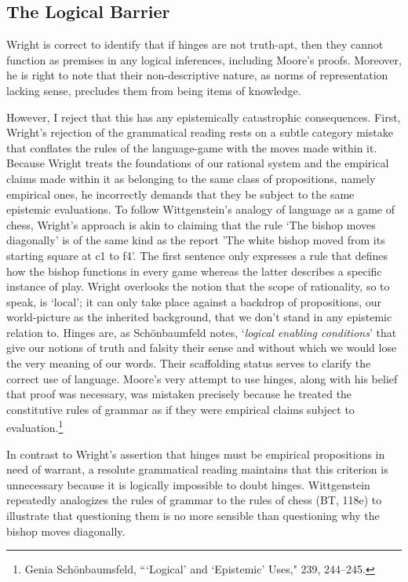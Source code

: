 \subsection{The Logical Barrier}

Wright is correct to identify that if hinges are not truth-apt, then
they cannot function as premises in any logical inferences, including
Moore's proofs. Moreover, he is right to note that their non-descriptive
nature, as norms of representation lacking sense, precludes them from
being items of knowledge.

However, I reject that this has any epistemically catastrophic
consequences. First, Wright's rejection of the grammatical reading rests
on a subtle category mistake that conflates the rules of the
language-game with the moves made within it. Because Wright treats the
foundations of our rational system and the empirical claims made within
it as belonging to the same class of propositions, namely empirical
ones, he incorrectly demands that they be subject to the same epistemic
evaluations. To follow Wittgenstein's analogy of language as a game of
chess, Wright's approach is akin to claiming that the rule `The bishop
moves diagonally' is of the same kind as the report 'The white bishop
moved from its starting square at c1 to f4'. The first sentence only
expresses a rule that defines how the bishop functions in every game
whereas the latter describes a specific instance of play. Wright
overlooks the notion that the scope of rationality, so to speak, is
`local'; it can only take place against a backdrop of propositions, our
world-picture as the inherited background, that we don't stand in any
epistemic relation to. Hinges are, as Schönbaumfeld notes,
`\emph{logical enabling conditions}' that give our notions of truth and
falsity their sense and without which we would lose the very meaning of
our words. Their scaffolding status serves to clarify the correct use of
language. Moore's very attempt to use hinges, along with his belief that
proof was necessary, was mistaken precisely because he treated the
constitutive rules of grammar as if they were empirical claims subject
to evaluation.\footnote{Genia Schönbaumsfeld, ``\hspace{1pt}`Logical' and `Epistemic'
  Uses," 239, 244--245.}

In contrast to Wright's assertion that hinges must be empirical
propositions in need of warrant, a resolute grammatical reading
maintains that this criterion is unnecessary because it is logically
impossible to doubt hinges. Wittgenstein repeatedly analogizes the rules
of grammar to the rules of chess (BT, 118e) to illustrate that
questioning them is no more sensible than questioning why the bishop
moves diagonally.

